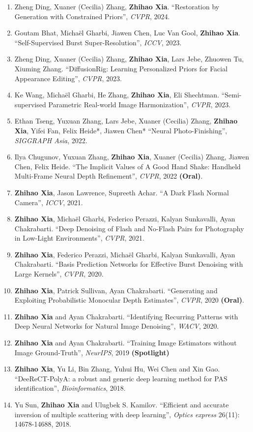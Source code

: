 \documentclass{resume} %
\newcommand{\B}[1]{\textbf{#1}}
\newcommand{\pub}[1]{\textrm{\textit{#1}}}
\begin{document}
\begin{enumerate}
  \item Zheng Ding, Xuaner (Cecilia) Zhang, \B{Zhihao Xia}. ``Restoration by Generation with Constrained Priors'', \pub{CVPR}, 2024.
  \item Goutam Bhat, Micha\"el Gharbi, Jiawen Chen, Luc Van Gool, \B{Zhihao Xia}. ``Self-Supervised Burst Super-Resolution'', \pub{ICCV}, 2023.
  \item Zheng Ding, Xuaner (Cecilia) Zhang, \B{Zhihao Xia}, Lars Jebe, Zhuowen Tu, Xiuming Zhang. ``DiffusionRig: Learning Personalized Priors for Facial Appearance Editing'', \pub{CVPR}, 2023.
  \item Ke Wang, Michaël Gharbi, He Zhang, \B{Zhihao Xia}, Eli Shechtman. ``Semi-supervised Parametric Real-world Image Harmonization'', \pub{CVPR}, 2023.
  \item Ethan Tseng, Yuxuan Zhang, Lars Jebe, Xuaner (Cecilia) Zhang, \B{Zhihao Xia}, Yifei Fan, Felix Heide*, Jiawen Chen* ``Neural Photo-Finishing'', \pub{SIGGRAPH Asia}, 2022.
  \item Ilya Chugunov, Yuxuan Zhang, \B{Zhihao Xia}, Xuaner (Cecilia) Zhang, Jiawen Chen, Felix Heide. ``The Implicit Values of A Good Hand Shake: Handheld Multi-Frame Neural Depth Refinement'', \pub{CVPR}, 2022 \B{(Oral)}.
  \item \B{Zhihao Xia}, Jason Lawrence, Supreeth Achar. ``A Dark Flash Normal Camera'', \pub{ICCV}, 2021.
  \item \B{Zhihao Xia}, Micha\"el Gharbi, Federico Perazzi, Kalyan Sunkavalli, Ayan Chakrabarti. ``Deep Denoising of Flash and No-Flash Pairs for Photography in Low-Light Environments'', \pub{CVPR}, 2021.
  \item \B{Zhihao Xia}, Federico Perazzi, Micha\"el Gharbi, Kalyan Sunkavalli, Ayan Chakrabarti. ``Basis Prediction Networks for Effective Burst Denoising with Large Kernels'', \pub{CVPR}, 2020.
  \item \B{Zhihao Xia}, Patrick Sullivan, Ayan Chakrabarti. ``Generating and Exploiting Probabilistic Monocular Depth Estimates'', \pub{CVPR}, 2020 \B{(Oral)}.
  \item \B{Zhihao Xia} and Ayan Chakrabarti. ``Identifying Recurring Patterns with Deep Neural Networks for Natural Image Denoising'', \pub{WACV}, 2020.
  \item \B{Zhihao Xia} and Ayan Chakrabarti. ``Training Image Estimators without Image Ground-Truth'', \pub{NeurIPS}, 2019 \B{(Spotlight)}
  \item \B{Zhihao Xia}, Yu Li, Bin Zhang, Yuhui Hu, Wei Chen and Xin Gao. ``DeeReCT-PolyA: a robust and generic deep learning method for PAS identification'', \pub{Bioinformatics}, 2018.
  \item Yu Sun, \B{Zhihao Xia} and Ulugbek S. Kamilov. ``Efficient and accurate inversion of multiple scattering with deep learning'', \pub{Optics express} 26(11): 14678-14688, 2018.
  \end{enumerate}
\end{document}
